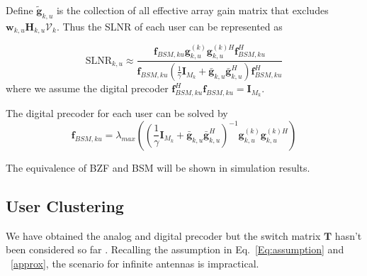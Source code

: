 \documentclass[conference]{IEEEtran}
\begin{document}
{Define $\tilde{\bm{g}}_{k,u}$ is the collection of all effective array gain matrix that excludes $\bm{w}_{k,u} \bm{H}_{k,u} \bm{\mathcal{V}}_k$. Thus the SLNR of each user can be represented as

\begin{equation}
\text{SLNR}_{k,u} \approx \frac{\bm{f}_{BSM, ku}{\bm{g}}_{k,u}^{(k)}{\bm{g}}_{k,u}^{(k)H} \bm{f}^H_{BSM, ku}}{\bm{f}_{BSM, ku}(\frac{1}{\gamma}\bm{I}_{M_k}+\bar{\bm{g}}_{k,u}\bar{\bm{g}}_{k,u}^{H})\bm{f}^H_{BSM, ku}}
\end{equation}
where we assume the digital precoder $\bm{f}_{BSM,ku}^H \bm{f}_{BSM,ku}=\bm{I}_{M_k}$.

The digital precoder for each user can be solved by \cite{wang2012statistical}
\begin{equation}
	\bm{f}_{BSM,ku} = \lambda_{max}\left( \left(\frac{1}{\gamma}\bm{I}_{M_k}+\bar{\bm{g}}_{k,u}\bar{\bm{g}}^{H}_{k,u} \right)^{-1}{\bm{g}}_{k,u}^{(k)}{\bm{g}}_{k,u}^{(k)H} \right)
\end{equation}

The equivalence of BZF and BSM  will be shown in simulation results.

\subsection{User Clustering}\label{clustering}
We have obtained the analog and digital precoder but the switch matrix $\bm{T}$ hasn't been considered so far . Recalling the assumption in Eq.~\eqref{Eq:assumption} and ~\eqref{approx}, the scenario for  infinite antennas is impractical.

}
\end{document}
